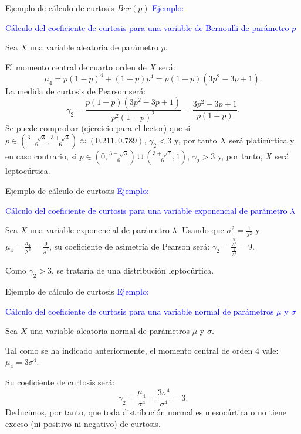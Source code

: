 \documentclass[
  ignorenonframetext,
  aspectratio=169]{beamer}
\newcommand\blue[1]{\textcolor{blue}{#1}}
\begin{document}
\begin{frame}{Ejemplo de cálculo de curtosis \(Ber(p)\)}
\protect\hypertarget{ejemplo-de-cuxe1lculo-de-curtosis-berp}{}
\blue{Ejemplo:}

\blue{Cálculo del coeficiente de curtosis para una variable de Bernoulli de parámetro $p$}

Sea \(X\) una variable aleatoria de parámetro \(p\).

El momento central de cuarto orden de \(X\) será: \[
\mu_4 = p (1-p)^4 +(1-p)p^4 = p (1-p) (3 p^2-3p+1).
\] La medida de curtosis de Pearson será: \[
\gamma_2 = \frac{p (1-p) (3 p^2-3p+1)}{p^2 (1-p)^2} = \frac{3 p^2-3p+1}{p(1-p)}.
\] Se puede comprobar (ejercicio para el lector) que si
\(p\in \left(\frac{3-\sqrt{3}}{6},\frac{3+\sqrt{3}}{6}\right)\approx (0.211,0.789)\),
\(\gamma_2 <3\) y, por tanto \(X\) será platicúrtica y en caso
contrario, si
\(p\in \left(0,\frac{3-\sqrt{3}}{6}\right)\cup \left(\frac{3+\sqrt{3}}{6},1\right)\),
\(\gamma_2 >3\) y, por tanto, \(X\) será leptocúrtica.
\end{frame}

\begin{frame}{Ejemplo de cálculo de curtosis}
\protect\hypertarget{ejemplo-de-cuxe1lculo-de-curtosis}{}
\blue{Ejemplo:}

\blue{Cálculo del coeficiente de curtosis para una variable exponencial de parámetro $\lambda$}

Sea \(X\) una variable exponencial de parámetro \(\lambda\). Usando que
\(\sigma^2=\frac{1}{\lambda^2}\) y
\(\mu_4 =\frac{a_4}{\lambda^3}=\frac{9}{\lambda^4}\), su coeficiente de
asimetría de Pearson será:
\(\gamma_2 = \frac{\frac{9}{\lambda^4}}{\frac{1}{\lambda^4}}=9.\)

Como \(\gamma_2 >3\), se trataría de una distribución leptocúrtica.
\end{frame}

\begin{frame}{Ejemplo de cálculo de curtosis}
\protect\hypertarget{ejemplo-de-cuxe1lculo-de-curtosis-1}{}
\blue{Ejemplo:}

\blue{Cálculo del coeficiente de curtosis para una variable normal de parámetros $\mu$ y $\sigma$}

Sea \(X\) una variable aleatoria normal de parámetros \(\mu\) y
\(\sigma\).

Tal como se ha indicado anteriormente, el momento central de orden 4
vale: \(\mu_4 = 3\sigma^4\).

Su coeficiente de curtosis será: \[
\gamma_2 =\frac{\mu_4}{\sigma^4}=\frac{3\sigma^4}{\sigma^4}=3.
\] Deducimos, por tanto, que toda distribución normal es mesocúrtica o
no tiene exceso (ni positivo ni negativo) de curtosis.
\end{frame}
\end{document}
